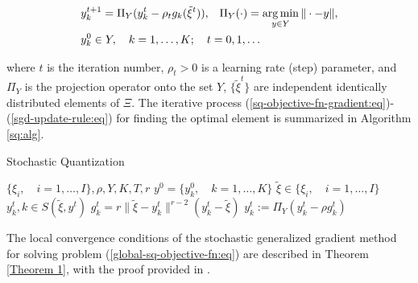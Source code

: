 \begin{eqnarray}
    \label{sgd-update-rule:eq}
    \begin{aligned}
        & y^{t+1}_k = \Pi_{Y} (y^t_k - \rho_t g_k(\tilde{\xi}^t)), \;\;\; \Pi_{Y} (\cdot) = \operatorname*{arg\,min}_{y \in Y} \| \cdot - y\|, \\
        & y^0_k \in Y, \quad k=1,\ldots,K;\quad t=0,1,\ldots
    \end{aligned}
\end{eqnarray}

\noindent where $t$ is the iteration number, $\rho_t > 0$ is a learning rate (step) parameter, and $\Pi_{Y}$ is the projection operator onto the set $Y$, $\{\tilde{\xi}^t\}$ are independent identically distributed elements of $\Xi$. The iterative process (\ref{sq-objective-fn-gradient:eq})-(\ref{sgd-update-rule:eq}) for finding the optimal element is summarized in Algorithm \ref{sq:alg}.

\begin{algorithm}
    \caption{Stochastic Quantization}\label{sq:alg}
    \begin{algorithmic}[1]
        \Require $\{ \xi_i, \quad i = 1, \ldots, I \}, \rho, Y, K, T, r$
        \State $y^0 = \{ y_k^0, \quad k = 1, \ldots, K \}$ 
            \State $\tilde{\xi} \in \{ \xi_i, \quad i = 1, \ldots, I \}$ 
            \State $y_k^t, k \in S(\tilde{\xi}, y^t)$ 
            \State $g_k^t = r \| \tilde{\xi} - y_k^t \|^{r - 2} (y_k^t - \tilde{\xi})$ 
            \State $y_k^t := \Pi_Y (y_k^t - \rho g_k^t)$ 
        \EndFor
    \end{algorithmic}
\end{algorithm}

The local convergence conditions of the stochastic generalized gradient method for solving problem (\ref{global-sq-objective-fn:eq}) are described in Theorem \ref{Theorem 1}, with the proof provided in \cite{Ermoliev_Norkin_2003,Ermolev_Norkin_1998}.

